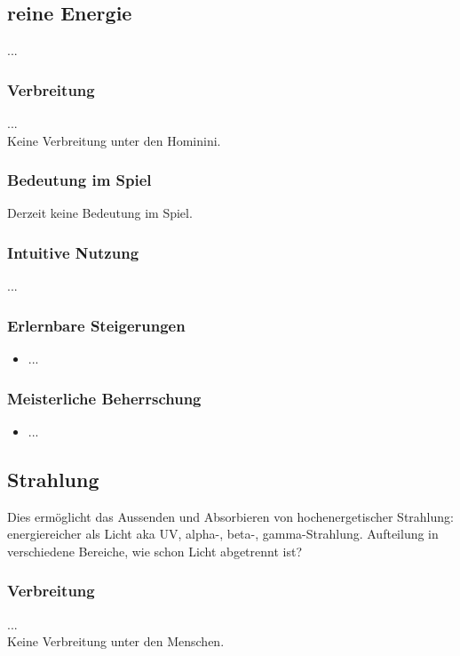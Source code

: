 \subsection{reine Energie}\label{sec:energiemagie}
...

\subsubsection{Verbreitung}
...\\
Keine Verbreitung unter den Hominini.

\subsubsection{Bedeutung im Spiel}
Derzeit keine Bedeutung im Spiel.

\subsubsection{Intuitive Nutzung}
...

\subsubsection{Erlernbare Steigerungen}
\begin{itemize}
	\item ...
\end{itemize}

\subsubsection{Meisterliche Beherrschung} 
\begin{itemize}
	\item ...
\end{itemize}



\subsection{Strahlung}\label{sec:strahlungsmagie}
Dies ermöglicht das Aussenden und Absorbieren von hochenergetischer Strahlung: energiereicher als Licht aka UV, alpha-, beta-, gamma-Strahlung. Aufteilung in verschiedene Bereiche, wie schon Licht abgetrennt ist? 

\subsubsection{Verbreitung}
...\\
Keine Verbreitung unter den Menschen.

